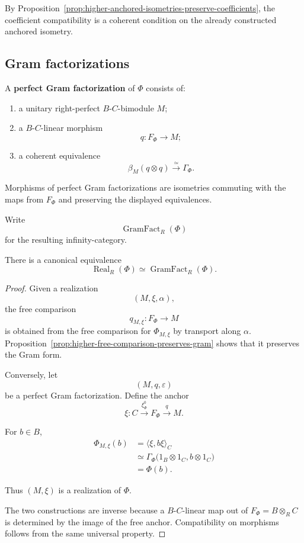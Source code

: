 By Proposition~\ref{prop:higher-anchored-isometries-preserve-coefficients},
the coefficient compatibility is a coherent condition on the already
constructed anchored isometry.

\subsection{Gram factorizations}

\begin{definition}
\label{def:higher-perfect-gram-factorization}
A \textbf{perfect Gram factorization} of \(\Phi\) consists of:

\begin{enumerate}
  \item a unitary right-perfect \(B\)-\(C\)-bimodule \(M\);

  \item a \(B\)-\(C\)-linear morphism
  \[
    q:F_\Phi\to M;
  \]

  \item a coherent equivalence
  \[
    \beta_M(q\otimes q)
    \xrightarrow{\simeq}
    \Gamma_\Phi.
  \]
\end{enumerate}

Morphisms of perfect Gram factorizations are isometries commuting with the
maps from \(F_\Phi\) and preserving the displayed equivalences.

Write
\[
  \operatorname{GramFact}_R(\Phi)
\]
for the resulting infinity-category.
\end{definition}

\begin{proposition}
\label{prop:higher-realizations-gram-factorizations}
There is a canonical equivalence
\[
  \operatorname{Real}_R(\Phi)
  \simeq
  \operatorname{GramFact}_R(\Phi).
\]
\end{proposition}

\begin{proof}
Given a realization
\[
  (M,\xi,\alpha),
\]
the free comparison
\[
  q_{M,\xi}:F_\Phi\to M
\]
is obtained from the free comparison for \(\Phi_{M,\xi}\) by transport along
\(\alpha\). Proposition~\ref{prop:higher-free-comparison-preserves-gram}
shows that it preserves the Gram form.

Conversely, let
\[
  (M,q,\varepsilon)
\]
be a perfect Gram factorization. Define the anchor
\[
  \xi:
  C
  \xrightarrow{\xi_\Phi^0}
  F_\Phi
  \xrightarrow{q}
  M.
\]

For \(b\in B\),
\[
\begin{aligned}
  \Phi_{M,\xi}(b)
  &=
  \langle\xi,b\xi\rangle_C
  \\
  &\simeq
  \Gamma_\Phi
  \bigl(
    1_B\otimes1_C,
    b\otimes1_C
  \bigr)
  \\
  &=
  \Phi(b).
\end{aligned}
\]

Thus \((M,\xi)\) is a realization of \(\Phi\).

The two constructions are inverse because a \(B\)-\(C\)-linear map out of
\(F_\Phi=B\otimes_RC\) is determined by the image of the free anchor.
Compatibility on morphisms follows from the same universal property.
\end{proof}

